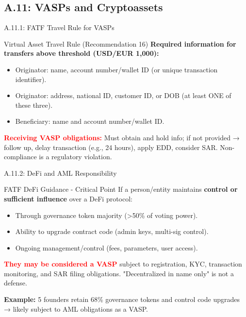 \documentclass{beamer}
\begin{document}
	\subsection{A.11: VASPs and Cryptoassets}
	
	\begin{frame}{A.11.1: FATF Travel Rule for VASPs}
		\begin{block}{Virtual Asset Travel Rule (Recommendation 16)}
			\textbf{Required information for transfers above threshold (USD/EUR 1,000):}
			\begin{itemize}
				\item Originator: name, account number/wallet ID (or unique transaction identifier).
				\item Originator: address, national ID, customer ID, or DOB (at least ONE of these three).
				\item Beneficiary: name and account number/wallet ID.
			\end{itemize}
		\end{block}
		\textcolor{red}{\textbf{ Receiving VASP obligations:}} Must obtain and hold info; if not provided → follow up, delay transaction (e.g., 24 hours), apply EDD, consider SAR. Non-compliance is a regulatory violation.
	\end{frame}
	
	\begin{frame}{A.11.2: DeFi and AML Responsibility}
		\begin{block}{FATF DeFi Guidance - Critical Point}
			If a person/entity maintains \textbf{control or sufficient influence} over a DeFi protocol:
			\begin{itemize}
				\item Through governance token majority (>50\% of voting power).
				\item Ability to upgrade contract code (admin keys, multi-sig control).
				\item Ongoing management/control (fees, parameters, user access).
			\end{itemize}
			\vspace{0.2cm}
			\textcolor{red}{\textbf{They may be considered a VASP}} subject to registration, KYC, transaction monitoring, and SAR filing obligations. "Decentralized in name only" is not a defense.
		\end{block}
		\textbf{Example:} 5 founders retain 68\% governance tokens and control code upgrades → likely subject to AML obligations as a VASP.
	\end{frame}
	
\end{document}
